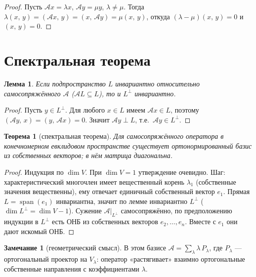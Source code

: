 \documentclass[11pt,a4paper]{article}
\theoremstyle{definition}
\newtheorem{remark}[definition]{Замечание}
\theoremstyle{plain}
\newtheorem{theorem}[definition]{Теорема}
\newtheorem{lemma}[definition]{Лемма}
\DeclareMathOperator{\Span}{span}
\newcommand{\scal}[2]{\left( #1,\,#2\right)}
\begin{document}
\begin{proof}
Пусть $\mathcal Ax=\lambda x$, $\mathcal Ay=\mu y$, $\lambda\ne\mu$. Тогда
$\lambda\scal xy=\scal{\mathcal Ax}{y}=\scal{x}{\mathcal Ay}=\mu\scal xy$, откуда
$(\lambda-\mu)\scal xy=0$ и $\scal xy=0$.
\end{proof}

\section{Спектральная теорема}

\begin{lemma}
Если подпространство $L$ инвариантно относительно самосопряжённого $\mathcal A$
($\mathcal A L\subseteq L$), то и $L^\perp$ инвариантно.
\end{lemma}

\begin{proof}
Пусть $y\in L^\perp$. Для любого $x\in L$ имеем $\mathcal Ax\in L$, поэтому
$\scal{\mathcal Ay}{x}=\scal{y}{\mathcal Ax}=0$. Значит $\mathcal Ay\perp L$, т.е.\
$\mathcal Ay\in L^\perp$.
\end{proof}

\begin{theorem}[спектральная теорема]
Для самосопряжённого оператора в конечномерном евклидовом пространстве существует ортонормированный
базис из собственных векторов; в нём матрица диагональна.
\end{theorem}

\begin{proof}
Индукция по $\dim V$. При $\dim V=1$ утверждение очевидно. Шаг: характеристический многочлен имеет
вещественный корень $\lambda_1$ (собственные значения вещественны), ему отвечает единичный
собственный вектор $e_1$. Прямая $L=\Span(e_1)$ инвариантна, значит по лемме инвариантно
$L^\perp$ ($\dim L^\perp=\dim V-1$). Сужение $\mathcal A|_{L^\perp}$ самосопряжённо, по
предположению индукции в $L^\perp$ есть ОНБ из собственных векторов $e_2,\dots,e_n$. Вместе с $e_1$
они дают искомый ОНБ.
\end{proof}

\begin{remark}[геометрический смысл]
В этом базисе $\mathcal A=\sum_\lambda\lambda\,P_\lambda$, где $P_\lambda$ — ортогональный проектор
на $V_\lambda$: оператор «растягивает» взаимно ортогональные собственные направления с
коэффициентами $\lambda$.
\end{remark}
\end{document}
